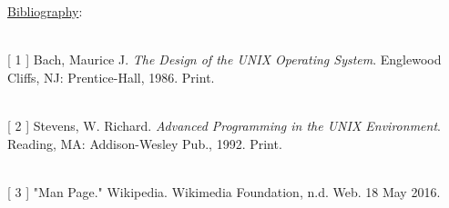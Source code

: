 \documentclass[12pt]{extarticle}
\begin{document}
\newpage
\noindent
{\large \underline{Bibliography}:}

\ \\
{[} 1 {]} \hspace{1.2mm} Bach, Maurice J. \textit{The Design of the UNIX Operating System}. Englewood Cliffs, NJ:
\hspace*{1cm} Prentice-Hall, 1986. Print.

\ \\
{[} 2 {]} \hspace{1.2mm} Stevens, W. Richard. \textit{Advanced Programming in the UNIX Environment}. Reading,
\hspace*{1cm} MA: Addison-Wesley Pub., 1992. Print.

\ \\
{[} 3 {]} \hspace{1.2mm} "Man Page." Wikipedia. Wikimedia Foundation, n.d. Web. 18 May 2016.
\end{document}
